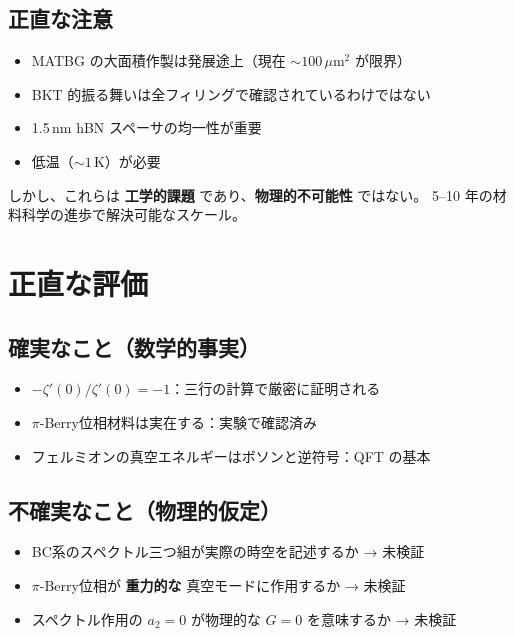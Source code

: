 \documentclass[11pt,a4paper]{article}
\begin{document}
\subsection{正直な注意}

\begin{itemize}
\item MATBG の大面積作製は発展途上（現在 $\sim 100\,\mu$m$^2$ が限界）
\item BKT 的振る舞いは全フィリングで確認されているわけではない
\item 1.5\,nm hBN スペーサの均一性が重要
\item 低温（$\sim 1$\,K）が必要
\end{itemize}

しかし、これらは \textbf{工学的課題} であり、\textbf{物理的不可能性} ではない。
5--10 年の材料科学の進歩で解決可能なスケール。

\section{正直な評価}

\subsection{確実なこと（数学的事実）}

\begin{itemize}
\item $-\zeta'(0)/\zeta'(0) = -1$：三行の計算で厳密に証明される
\item $\pi$-Berry位相材料は実在する：実験で確認済み
\item フェルミオンの真空エネルギーはボソンと逆符号：QFT の基本
\end{itemize}

\subsection{不確実なこと（物理的仮定）}

\begin{itemize}
\item BC系のスペクトル三つ組が実際の時空を記述するか → 未検証
\item $\pi$-Berry位相が \textbf{重力的な} 真空モードに作用するか → 未検証
\item スペクトル作用の $a_2 = 0$ が物理的な $G = 0$ を意味するか → 未検証
\end{itemize}
\end{document}
